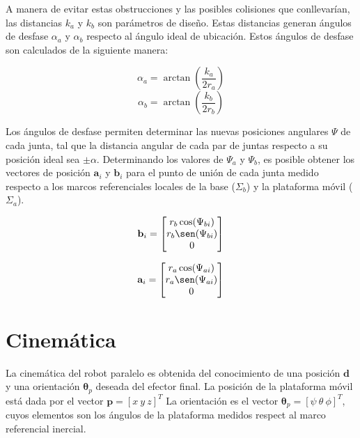 A manera de evitar estas obstrucciones y las posibles 
colisiones que conllevarían, 
las distancias $k_a$ y $k_b$ son parámetros de diseño.
Estas distancias generan ángulos de desfase 
$\alpha_a$ y $\alpha_b$ respecto al ángulo ideal de ubicación.
Estos ángulos de desfase son calculados de la siguiente manera:

\begin{equation} \label{eq: azi-a}
\alpha_a = \arctan\left(\frac{k_a}{2r_a}\right)
\end{equation}
\begin{equation} \label{eq: azi-b}
\alpha_b = \arctan\left(\frac{k_b}{2r_b}\right)
\end{equation}

Los ángulos de desfase permiten determinar las nuevas posiciones angulares 
$\Psi$ de cada junta, tal que la distancia angular de cada par de juntas 
respecto a su posición ideal sea $\pm \alpha$. 
Determinando los valores de $\Psi_a$ y $\Psi_b$, es posible
obtener los vectores de posición $\mathbf a_i$ y $\mathbf b_i$ 
para el punto de unión de cada junta
medido respecto a los marcos referenciales locales de 
la base ($\Sigma_b$) y la plataforma móvil ($\Sigma_a$).


\begin{equation} \label{eq: p_b}
\mathbf b_i = \begin{bmatrix}
r_b\cos(\Psi_{bi})\\
r_b\sen(\Psi_{bi})\\
0\\
\end{bmatrix}
\end{equation}

\begin{equation} \label{eq: p_a}
\mathbf a_i = \begin{bmatrix}
r_a\cos(\Psi_{ai})\\
r_a\sen(\Psi_{ai})\\
0\\
\end{bmatrix}
\end{equation}

\section{Cinemática}

La cinemática del robot paralelo es obtenida del conocimiento de una posición $\mathbf d$
y una orientación $\mathbf \theta_p$ deseada del efector final.
La posición de la plataforma móvil está dada por el vector $\mathbf p = [x \ y \ z]^T$
La orientación es el vector $\mathbf \theta_p = [\psi \ \theta \ \phi]^T$, 
cuyos elementos son los ángulos de la plataforma medidos respect al marco referencial inercial.

